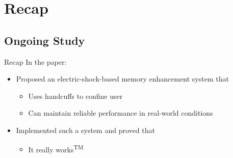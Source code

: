 \documentclass[UTF8,10pt,aspectratio=43]{ctexbeamer}
\begin{document}
\section{Recap}

\subsection{Ongoing Study}
\begin{frame}{Recap}  %
In the paper:
\begin{itemize}
\item Proposed an electric-shock-based memory enhancement system that
\begin{itemize}
\item Uses handcuffs to confine user
\item Can maintain reliable performance in real-world conditions
\end{itemize}
\item Implemented such a system and proved that
\begin{itemize}
\item It really works\textsuperscript{TM}
\end{itemize}
\end{itemize}
\end{frame}
\end{document}
